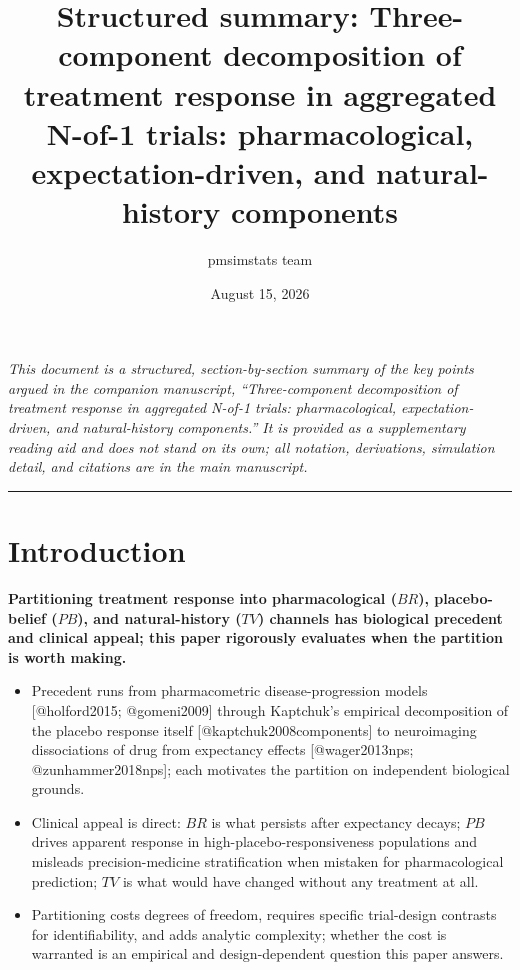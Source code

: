 \documentclass[
  11pt,
]{article}
\title{Structured summary: Three-component decomposition of treatment response in aggregated N-of-1 trials: pharmacological, expectation-driven, and natural-history components}
\author{pmsimstats team}
\date{August 15, 2026}
\begin{document}
\maketitle

{
\setcounter{tocdepth}{2}
\tableofcontents
}
\emph{This document is a structured, section-by-section summary of the key points argued in the companion manuscript, ``Three-component decomposition of treatment response in aggregated N-of-1 trials: pharmacological, expectation-driven, and natural-history components.'' It is provided as a supplementary reading aid and does not stand on its own; all notation, derivations, simulation detail, and citations are in the main manuscript.}

\bigskip\noindent

\rule{\textwidth}{0.4pt}\bigskip

\section{Introduction}\label{introduction}

\textbf{Partitioning treatment response into pharmacological ($BR$), placebo-belief ($PB$), and natural-history ($TV$) channels has biological precedent and clinical appeal; this paper rigorously evaluates when the partition is worth making.}

\begin{itemize}\setlength{\itemsep}{2pt}\setlength{\parskip}{0pt}
\item Precedent runs from pharmacometric disease-progression models [@holford2015; @gomeni2009] through Kaptchuk's empirical decomposition of the placebo response itself [@kaptchuk2008components] to neuroimaging dissociations of drug from expectancy effects [@wager2013nps; @zunhammer2018nps]; each motivates the partition on independent biological grounds.
\item Clinical appeal is direct: $BR$ is what persists after expectancy decays; $PB$ drives apparent response in high-placebo-responsiveness populations and misleads precision-medicine stratification when mistaken for pharmacological prediction; $TV$ is what would have changed without any treatment at all.
\item Partitioning costs degrees of freedom, requires specific trial-design contrasts for identifiability, and adds analytic complexity; whether the cost is warranted is an empirical and design-dependent question this paper answers.
\end{itemize}
\end{document}
